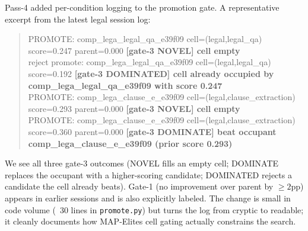 \documentclass[11pt,a4paper]{article}
\begin{document}
Pass-4 added per-condition logging to the promotion gate. A representative excerpt from the latest legal session log:
\begin{quote}\small\ttfamily
PROMOTE: comp\_lega\_legal\_qa\_e39f09 cell=(legal,legal\_qa) score=0.247 parent=0.000 \textbf{[gate-3 NOVEL] cell empty}\\
reject promote: comp\_lega\_legal\_qa\_e39f09 cell=(legal,legal\_qa) score=0.192 \textbf{[gate-3 DOMINATED] cell already occupied by comp\_lega\_legal\_qa\_e39f09 with score 0.247}\\
PROMOTE: comp\_lega\_clause\_e\_e39f09 cell=(legal,clause\_extraction) score=0.293 parent=0.000 \textbf{[gate-3 NOVEL] cell empty}\\
PROMOTE: comp\_lega\_clause\_e\_e39f09 cell=(legal,clause\_extraction) score=0.360 parent=0.000 \textbf{[gate-3 DOMINATE] beat occupant comp\_lega\_clause\_e\_e39f09 (prior score 0.293)}
\end{quote}
We see all three gate-3 outcomes (NOVEL fills an empty cell; DOMINATE replaces the occupant with a higher-scoring candidate; DOMINATED rejects a candidate the cell already beats). Gate-1 (no improvement over parent by $\geq 2$pp) appears in earlier sessions and is also explicitly labeled. The change is small in code volume (~30 lines in \texttt{promote.py}) but turns the log from cryptic to readable; it cleanly documents how MAP-Elites cell gating actually constrains the search.
\end{document}

